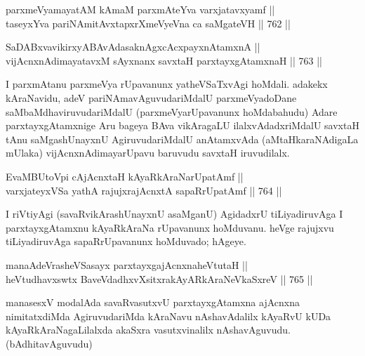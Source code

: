 
\begin{shl}
parxmeVyamayatAM kAmaM parxmAteYva varxjatavxyamf || \\
taseyxYva pariNAmitAvxtapxrXmeVyeVna ca saMgateVH \hfill || 762 ||  
\end{shl}

\begin{shl}
SaDABxvavikirxyABAvAdasaknAgxcAcxpayxnAtamxnA || \\
vijAcnxnAdimayatavxM sAyxnanx savxtaH parxtayxgAtamxnaH \hfill || 763 ||  
\end{shl}

\begin{artha} 
I parxmAtanu parxmeVya rUpavanunx yatheVSaTxvAgi hoMdali. adakekx kAraNavidu, adeV pariNAmavAguvudariMdalU parxmeVyadoDane saMbaMdhaviruvudariMdalU (parxmeVyarUpavanunx hoMdabahudu) Adare parxtayxgAtamxnige Aru bageya BAva vikAragaLU ilalxvAdadxriMdalU savxtaH tAnu saMgashUnayxnU AgiruvudariMdalU anAtamxvAda (aMtaHkaraNAdigaLa mUlaka) vijAcnxnAdimayarUpavu baruvudu savxtaH iruvudilalx.
\end{artha}

\begin{shl}
EvaMBUtoV\s pi cAjAcnxtaH kAyaRkAraNarUpatAmf || \\
varxjateyxVSa yathA rajujxrajAcnxtA sapaRrUpatAmf \hfill || 764 ||  
\end{shl}

\begin{artha} 
I riVtiyAgi (savaRvikArashUnayxnU asaMganU) AgidadxrU tiLiyadiruvAga I 
parxtayxgAtamxnu kAyaRkAraNa rUpavanunx hoMduvanu. heVge rajujxvu 
tiLiyadiruvAga sapaRrUpavanunx hoMduvado; hAgeye.  
\end{artha}
	

\begin{shl}
manaAdeVrasheVSasayx parxtayxgajAcnxnaheVtutaH || \\
heVtudhavxswtx BaveVdadhxvXsitxrakAyARkAraNeV\s kaSxreV \hfill || 765 ||  
\end{shl}

\begin{artha} 
manasesxV modalAda savaRvasutxvU parxtayxgAtamxna ajAcnxna nimitatxdiMda AgiruvudariMda kAraNavu nAshavAdalilx kAyaRvU kUDa kAyaRkAraNagaLilalxda akaSxra vasutxvinalilx nAshavAguvudu. (bAdhitavAguvudu)
\end{artha}

